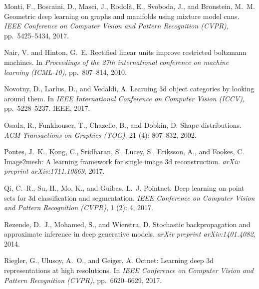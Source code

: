 \documentclass{article}
\begin{document}
\begin{thebibliography}{59}
Monti, F., Boscaini, D., Masci, J., Rodol{\`a}, E., Svoboda, J., and Bronstein,
  M.~M.
\newblock Geometric deep learning on graphs and manifolds using mixture model
  cnns.
\newblock \emph{IEEE Conference on Computer Vision and Pattern Recognition
  (CVPR)}, pp.\  5425--5434, 2017.

Nair, V. and Hinton, G.~E.
\newblock Rectified linear units improve restricted boltzmann machines.
\newblock In \emph{Proceedings of the 27th international conference on machine
  learning (ICML-10)}, pp.\  807--814, 2010.

Novotny, D., Larlus, D., and Vedaldi, A.
\newblock Learning 3d object categories by looking around them.
\newblock In \emph{IEEE International Conference on Computer Vision (ICCV)},
  pp.\  5228--5237. IEEE, 2017.

Osada, R., Funkhouser, T., Chazelle, B., and Dobkin, D.
\newblock Shape distributions.
\newblock \emph{ACM Transactions on Graphics (TOG)}, 21 (4):
  807--832, 2002.

Pontes, J.~K., Kong, C., Sridharan, S., Lucey, S., Eriksson, A., and Fookes, C.
\newblock Image2mesh: A learning framework for single image 3d reconstruction.
\newblock \emph{arXiv preprint arXiv:1711.10669}, 2017.

Qi, C.~R., Su, H., Mo, K., and Guibas, L.~J.
\newblock Pointnet: Deep learning on point sets for 3d classification and
  segmentation.
\newblock \emph{IEEE Conference on Computer Vision and Pattern Recognition
  (CVPR)}, 1 (2): 4, 2017.

Rezende, D.~J., Mohamed, S., and Wierstra, D.
\newblock Stochastic backpropagation and approximate inference in deep
  generative models.
\newblock \emph{arXiv preprint arXiv:1401.4082}, 2014.

Riegler, G., Ulusoy, A.~O., and Geiger, A.
\newblock Octnet: Learning deep 3d representations at high resolutions.
\newblock In \emph{IEEE Conference on Computer Vision and Pattern Recognition
  (CVPR)}, pp.\  6620--6629, 2017.


\end{thebibliography}
\end{document}
